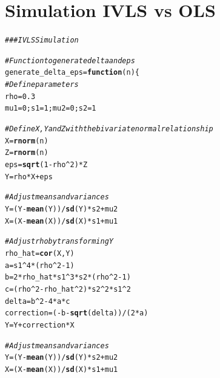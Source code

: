 \documentclass[11pt]{article}\usepackage[]{graphicx}\usepackage[]{color}
\makeatletter
\newcommand{\hlnum}[1]{\textcolor[rgb]{0.686,0.059,0.569}{#1}}%
\newcommand{\hlcom}[1]{\textcolor[rgb]{0.678,0.584,0.686}{\textit{#1}}}%
\newcommand{\hlopt}[1]{\textcolor[rgb]{0,0,0}{#1}}%
\newcommand{\hlstd}[1]{\textcolor[rgb]{0.345,0.345,0.345}{#1}}%
\newcommand{\hlkwa}[1]{\textcolor[rgb]{0.161,0.373,0.58}{\textbf{#1}}}%
\newcommand{\hlkwb}[1]{\textcolor[rgb]{0.69,0.353,0.396}{#1}}%
\newcommand{\hlkwc}[1]{\textcolor[rgb]{0.333,0.667,0.333}{#1}}%
\newcommand{\hlkwd}[1]{\textcolor[rgb]{0.737,0.353,0.396}{\textbf{#1}}}%
\newenvironment{kframe}{%
 \def\at@end@of@kframe{}%
 \ifinner\ifhmode%
  \def\at@end@of@kframe{\end{minipage}}%
  \begin{minipage}{\columnwidth}%
 \fi\fi%
 \def\FrameCommand##1{\hskip\@totalleftmargin \hskip-\fboxsep
 \colorbox{shadecolor}{##1}\hskip-\fboxsep
     \hskip-\linewidth \hskip-\@totalleftmargin \hskip\columnwidth}%
 \MakeFramed {\advance\hsize-\width
   \@totalleftmargin\z@ \linewidth\hsize
   \@setminipage}}%
 {\par\unskip\endMakeFramed%
 \at@end@of@kframe}
\newenvironment{knitrout}{}{} %
\makeatother
\begin{document}
\section{Simulation IVLS vs OLS}
\begin{knitrout}
\color{fgcolor}\begin{kframe}
\begin{alltt}
\hlcom{## # IVLS Simulation}

\hlcom{# Function to generate delta and eps}
\hlstd{generate_delta_eps} \hlkwb{=} \hlkwa{function}\hlstd{(}\hlkwc{n}\hlstd{)\{}
  \hlcom{# Define parameters}
  \hlstd{rho} \hlkwb{=} \hlnum{0.3}
  \hlstd{mu1}\hlkwb{=}\hlnum{0}\hlstd{; s1}\hlkwb{=}\hlnum{1}\hlstd{; mu2}\hlkwb{=}\hlnum{0}\hlstd{; s2}\hlkwb{=}\hlnum{1}

  \hlcom{# Define X, Y and Z with the bivariate normal relationship}
  \hlstd{X} \hlkwb{=} \hlkwd{rnorm}\hlstd{(n)}
  \hlstd{Z} \hlkwb{=} \hlkwd{rnorm}\hlstd{(n)}
  \hlstd{eps} \hlkwb{=} \hlkwd{sqrt}\hlstd{(}\hlnum{1}\hlopt{-}\hlstd{rho}\hlopt{^}\hlnum{2}\hlstd{)} \hlopt{*} \hlstd{Z}
  \hlstd{Y} \hlkwb{=} \hlstd{rho} \hlopt{*} \hlstd{X} \hlopt{+} \hlstd{eps}

  \hlcom{# Adjust means and variances}
  \hlstd{Y} \hlkwb{=} \hlstd{(Y}\hlopt{-}\hlkwd{mean}\hlstd{(Y))}\hlopt{/}\hlkwd{sd}\hlstd{(Y)}\hlopt{*}\hlstd{s2}\hlopt{+}\hlstd{mu2}
  \hlstd{X} \hlkwb{=} \hlstd{(X}\hlopt{-}\hlkwd{mean}\hlstd{(X))}\hlopt{/}\hlkwd{sd}\hlstd{(X)}\hlopt{*}\hlstd{s1}\hlopt{+}\hlstd{mu1}

  \hlcom{# Adjust rho by transforming Y}
  \hlstd{rho_hat} \hlkwb{=} \hlkwd{cor}\hlstd{(X,Y)}
  \hlstd{a} \hlkwb{=} \hlstd{s1}\hlopt{^}\hlnum{4}\hlopt{*}\hlstd{(rho}\hlopt{^}\hlnum{2}\hlopt{-}\hlnum{1}\hlstd{)}
  \hlstd{b} \hlkwb{=} \hlnum{2}\hlopt{*}\hlstd{rho_hat}\hlopt{*}\hlstd{s1}\hlopt{^}\hlnum{3}\hlopt{*}\hlstd{s2}\hlopt{*}\hlstd{(rho}\hlopt{^}\hlnum{2}\hlopt{-}\hlnum{1}\hlstd{)}
  \hlstd{c} \hlkwb{=} \hlstd{(rho}\hlopt{^}\hlnum{2}\hlopt{-}\hlstd{rho_hat}\hlopt{^}\hlnum{2}\hlstd{)}\hlopt{*}\hlstd{s2}\hlopt{^}\hlnum{2}\hlopt{*}\hlstd{s1}\hlopt{^}\hlnum{2}
  \hlstd{delta} \hlkwb{=} \hlstd{b}\hlopt{^}\hlnum{2}\hlopt{-}\hlnum{4}\hlopt{*}\hlstd{a}\hlopt{*}\hlstd{c}
  \hlstd{correction} \hlkwb{=} \hlstd{(}\hlopt{-}\hlstd{b}\hlopt{-}\hlkwd{sqrt}\hlstd{(delta))}\hlopt{/}\hlstd{(}\hlnum{2}\hlopt{*}\hlstd{a)}
  \hlstd{Y}\hlkwb{=}\hlstd{Y}\hlopt{+}\hlstd{correction}\hlopt{*}\hlstd{X}

  \hlcom{# Adjust means and variances}
  \hlstd{Y} \hlkwb{=} \hlstd{(Y}\hlopt{-}\hlkwd{mean}\hlstd{(Y))}\hlopt{/}\hlkwd{sd}\hlstd{(Y)}\hlopt{*}\hlstd{s2}\hlopt{+}\hlstd{mu2}
  \hlstd{X} \hlkwb{=} \hlstd{(X}\hlopt{-}\hlkwd{mean}\hlstd{(X))}\hlopt{/}\hlkwd{sd}\hlstd{(X)}\hlopt{*}\hlstd{s1}\hlopt{+}\hlstd{mu1}


\end{alltt}
\end{kframe}
\end{knitrout}
\end{document}
